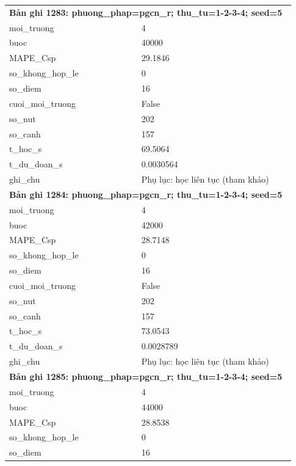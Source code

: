 \begin{longtable}{p{0.43\linewidth}p{0.50\linewidth}}
\midrule
\multicolumn{2}{p{0.95\linewidth}}{\textbf{Bản ghi 1283: phuong\_phap=pgcn\_r; thu\_tu=1-2-3-4; seed=5}} \\
moi\_\allowbreak truong & 4 \\
buoc & 40000 \\
MAPE\_\allowbreak Csp & 29.1846 \\
so\_\allowbreak khong\_\allowbreak hop\_\allowbreak le & 0 \\
so\_\allowbreak diem & 16 \\
cuoi\_\allowbreak moi\_\allowbreak truong & False \\
so\_\allowbreak nut & 202 \\
so\_\allowbreak canh & 157 \\
t\_\allowbreak hoc\_\allowbreak s & 69.5064 \\
t\_\allowbreak du\_\allowbreak doan\_\allowbreak s & 0.0030564 \\
ghi\_\allowbreak chu & Phụ lục: học liên tục (tham khảo) \\
\midrule
\multicolumn{2}{p{0.95\linewidth}}{\textbf{Bản ghi 1284: phuong\_phap=pgcn\_r; thu\_tu=1-2-3-4; seed=5}} \\
moi\_\allowbreak truong & 4 \\
buoc & 42000 \\
MAPE\_\allowbreak Csp & 28.7148 \\
so\_\allowbreak khong\_\allowbreak hop\_\allowbreak le & 0 \\
so\_\allowbreak diem & 16 \\
cuoi\_\allowbreak moi\_\allowbreak truong & False \\
so\_\allowbreak nut & 202 \\
so\_\allowbreak canh & 157 \\
t\_\allowbreak hoc\_\allowbreak s & 73.0543 \\
t\_\allowbreak du\_\allowbreak doan\_\allowbreak s & 0.0028789 \\
ghi\_\allowbreak chu & Phụ lục: học liên tục (tham khảo) \\
\midrule
\multicolumn{2}{p{0.95\linewidth}}{\textbf{Bản ghi 1285: phuong\_phap=pgcn\_r; thu\_tu=1-2-3-4; seed=5}} \\
moi\_\allowbreak truong & 4 \\
buoc & 44000 \\
MAPE\_\allowbreak Csp & 28.8538 \\
so\_\allowbreak khong\_\allowbreak hop\_\allowbreak le & 0 \\
so\_\allowbreak diem & 16 \\

\end{longtable}
